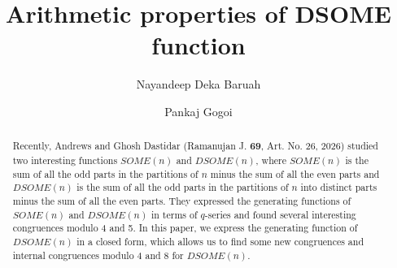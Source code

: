 \documentclass[12pt]{amsart}
\theoremstyle{definition}
\numberwithin{equation}{section}
\begin{document}
\title[Arithmetic properties of DSOME function]{Arithmetic properties of DSOME function}



\author[N. D. Baruah]{Nayandeep Deka Baruah}
\address{Department of Mathematical Sciences, Tezpur University,\\  Assam 784028, India}

\author[P. Gogoi]{Pankaj Gogoi}
\address{Department of Mathematical Sciences, Tezpur University,\\  Assam 784028, India}


\date{}


\begin{abstract}
Recently, Andrews and Ghosh Dastidar (Ramanujan J. \textbf{69}, Art. No. 26, 2026) studied two interesting functions $SOME(n)$ and $DSOME(n)$, where $SOME(n)$ is the sum of all the odd parts in the partitions of $n$ minus the sum of all the even parts and $DSOME(n)$ is the sum of all the odd parts in the partitions of $n$ into distinct parts minus the sum of all the even parts. They expressed the generating functions of $SOME(n)$ and $DSOME(n)$ in terms of $q$-series and found several interesting congruences modulo 4 and 5. In this paper, we express the generating function of $DSOME(n)$ in a closed form, which  allows us to find some new congruences and internal congruences modulo 4 and 8 for $DSOME(n)$. 
\end{abstract}




\maketitle
\end{document}
